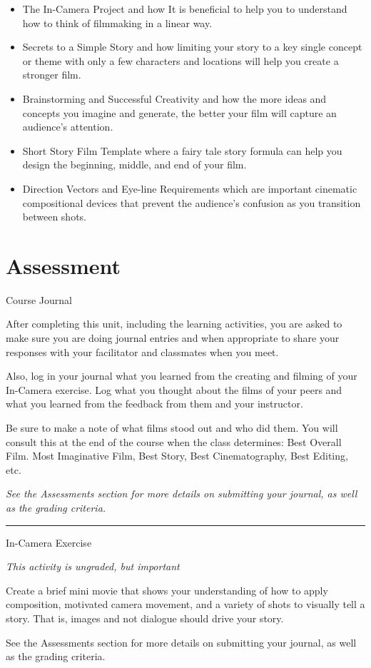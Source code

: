 \documentclass[
]{book}
\begin{document}
\begin{itemize}
\item
  The In-Camera Project and how It is beneficial to help you to understand how to think of filmmaking in a linear way.
\item
  Secrets to a Simple Story and how limiting your story to a key single concept or theme with only a few characters and locations will help you create a stronger film.
\item
  Brainstorming and Successful Creativity and how the more ideas and concepts you imagine and generate, the better your film will capture an audience's attention.
\item
  Short Story Film Template where a fairy tale story formula can help you design the beginning, middle, and end of your film.
\item
  Direction Vectors and Eye-line Requirements which are important cinematic compositional devices that prevent the audience's confusion as you transition between shots.
\end{itemize}

\hypertarget{assessment-10}{%
\section*{Assessment}\label{assessment-10}}

\begin{assessment}
{Course Journal}

After completing this unit, including the learning activities, you are asked to make sure you are doing journal entries and when appropriate to share your responses with your facilitator and classmates when you meet.

Also, log in your journal what you learned from the creating and filming of your In-Camera exercise. Log what you thought about the films of your peers and what you learned from the feedback from them and your instructor.

Be sure to make a note of what films stood out and who did them. You will consult this at the end of the course when the class determines: Best Overall Film. Most Imaginative Film, Best Story, Best Cinematography, Best Editing, etc.

\emph{See the Assessments section for more details on submitting your journal, as well as the grading criteria.}

\begin{center}\rule{0.5\linewidth}{0.5pt}\end{center}

{In-Camera Exercise}

\emph{This activity is ungraded, but important}

Create a brief mini movie that shows your understanding of how to apply composition, motivated camera movement, and a variety of shots to visually tell a story. That is, images and not dialogue should drive your story.

See the Assessments section for more details on submitting your journal, as well as the grading criteria.
\end{assessment}
\end{document}
